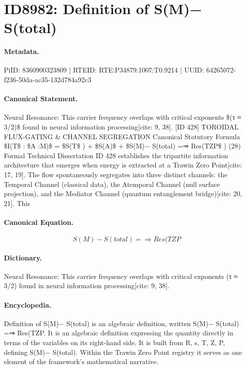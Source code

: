 \section*{ID8982: Definition of S(M)− S(total)}
\paragraph{Metadata.}
PiID: 8360900323809 | RTEID: RTE:P34879.1007:T0.9214 | UUID: 64265072-f236-50da-ac35-132d784a92c3

\paragraph{Canonical Statement.}
Neural Resonance: This carrier frequency overlaps with critical exponents \$(τ ≈ 3/2)\$ found in neural information processing[cite: 9, 38]. [ID 428] TOROIDAL FLUX-GATING \& CHANNEL SEGREGATION Canonical Statutory Formula \$I(T\$ : \$A :M)\$ = \$S(T\$ ) + \$S(A)\$ + \$S(M)− S(total) =⇒ Res(TZP\$ ) (28) Formal Technical Dissertation ID 428 establishes the tripartite information architecture that emerges when energy is extracted at a Trawin Zero Point[cite: 17, 19]. The flow spontaneously segregates into three distinct channels: the Temporal Channel (classical data), the Atemporal Channel (null surface projection), and the Mediator Channel (quantum entanglement bridge)[cite: 20, 21]. This

\paragraph{Canonical Equation.}
\[
S(M)− S(total) =⇒ Res(TZP
\]

\paragraph{Dictionary.}
Neural Resonance: This carrier frequency overlaps with critical exponents (τ ≈ 3/2) found in neural information processing[cite: 9, 38].

\paragraph{Encyclopedia.}
Definition of S(M)− S(total) is an algebraic definition, written S(M)− S(total) =⇒ Res(TZP. It is an algebraic definition expressing the quantity directly in terms of the variables on its right-hand side. It is built from R, s, T, Z, P, defining S(M)− S(total). Within the Trawin Zero Point registry it serves as one element of the framework's mathematical narrative.
